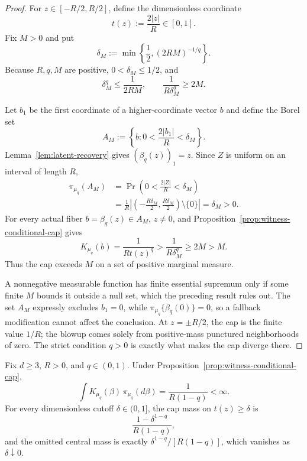 \begin{proof}
For $z\in[-R/2,R/2]$, define the dimensionless coordinate
\[
t(z):=\frac{2|z|}{R}\in[0,1].
\]
Fix $M>0$ and put
\[
\delta_M:=\min\left\{\frac12,(2RM)^{-1/q}\right\}.
\]
Because $R,q,M$ are positive,
$0<\delta_M\leq1/2$, and
\[
\delta_M^q\leq\frac{1}{2RM},
\qquad
\frac{1}{R\delta_M^q}\geq2M.
\]

Let $b_1$ be the first coordinate of a higher-coordinate vector $b$ and
define the Borel set
\[
A_M:=\left\{b:0<\frac{2|b_1|}{R}<\delta_M\right\}.
\]
Lemma~\ref{lem:latent-recovery} gives $(\beta_q(z))_1=z$.  Since $Z$ is
uniform on an interval of length $R$,
\[
\begin{aligned}
\pi_{\mu_q}(A_M)
&=\Pr\left(0<\frac{2|Z|}{R}<\delta_M\right)\\
&=\frac1R\left|
\left(-\frac{R\delta_M}{2},\frac{R\delta_M}{2}\right)
\setminus\{0\}\right|
=\delta_M>0.
\end{aligned}
\]
For every actual fiber $b=\beta_q(z)\in A_M$, $z\neq0$, and
Proposition~\ref{prop:witness-conditional-cap} gives
\[
K_{\mu_q}(b)
=\frac{1}{Rt(z)^q}
>\frac{1}{R\delta_M^q}
\geq2M>M.
\]
Thus the cap exceeds $M$ on a set of positive marginal measure.

A nonnegative measurable function has finite essential supremum only if
some finite $M$ bounds it outside a null set, which the preceding result
rules out.  The set $A_M$ expressly excludes $b_1=0$, while
$\pi_{\mu_q}\{\beta_q(0)\}=0$, so a fallback modification cannot affect
the conclusion.  At $z=\pm R/2$, the cap is the finite value $1/R$; the
blowup comes solely from positive-mass punctured neighborhoods of zero.
The strict condition $q>0$ is exactly what makes the cap diverge there.
\end{proof}

\begin{lemma}
\label{lem:exact-witness-average}
Fix $d\geq3$, $R>0$, and $q\in(0,1)$.  Under
Proposition~\ref{prop:witness-conditional-cap},
\[
\int K_{\mu_q}(\beta)\,\pi_{\mu_q}(d\beta)
=\frac{1}{R(1-q)}<\infty.
\]
For every dimensionless cutoff $\delta\in(0,1]$, the cap mass on
$t(z)\geq\delta$ is
\[
\frac{1-\delta^{1-q}}{R(1-q)},
\]
and the omitted central mass is exactly
$\delta^{1-q}/[R(1-q)]$, which vanishes as $\delta\downarrow0$.
\end{lemma}

